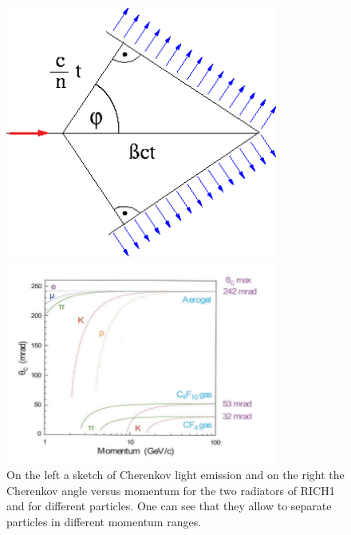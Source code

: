 \begin{center}
\begin{figure}[h!]
\label{Cherenkov}

\begin{minipage}{0.45\textwidth}

\centering \includegraphics[width=0.8\textwidth]{Detector/figs/detector/Cherenkov.png}

\end{minipage}
\begin{minipage}{0.55\textwidth}

\centering \includegraphics[width=0.8\textwidth]{Detector/figs/detector/RICH_performance.png}

\end{minipage}
\caption{On the left a sketch of Cherenkov light emission \cite{wikiCherenkov} and on the right the Cherenkov
angle versus momentum for the two radiators of RICH1 and for different particles. One can see that they allow
to separate particles in different momentum ranges.}
\end{figure}
\end{center}

